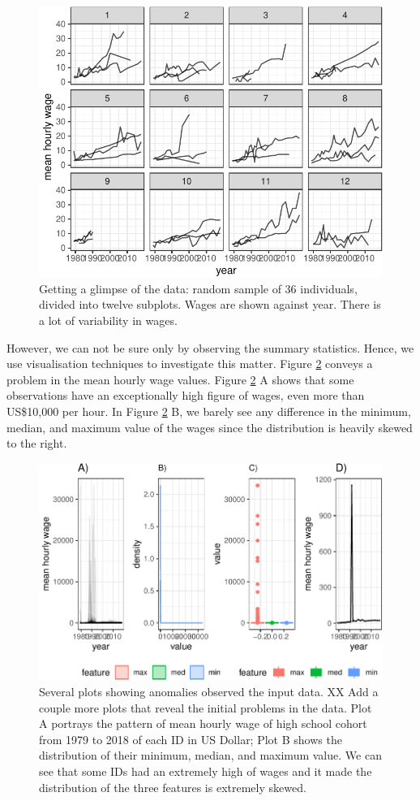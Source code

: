 \documentclass{article}
\begin{document}
\begin{figure}

{\centering \includegraphics[width=0.7\linewidth]{figures/sample-plot-1} 

}

\caption{Getting a glimpse of the data: random sample of 36 individuals, divided into  twelve subplots. Wages are shown against year. There is a lot of variability in wages.}\label{fig:sample-plot}
\end{figure}

However, we can not be sure only by observing the summary statistics. Hence, we use visualisation techniques to investigate this matter. Figure \ref{fig:feature-plot} conveys a problem in the mean hourly wage values. Figure \ref{fig:feature-plot} A shows that some observations have an exceptionally high figure of wages, even more than US\$10,000 per hour. In Figure \ref{fig:feature-plot} B, we barely see any difference in the minimum, median, and maximum value of the wages since the distribution is heavily skewed to the right.

\begin{figure}

{\centering \includegraphics[width=0.7\linewidth]{figures/feature-plot-1} 

}

\caption{Several plots showing anomalies observed the input data. XX Add a couple more plots that reveal the initial problems in the data. Plot A portrays the pattern of mean hourly wage of high school cohort from 1979 to 2018 of each ID in US Dollar; Plot B shows the distribution of their minimum, median, and maximum value. We can see that some IDs had an extremely high of wages and it made the distribution of the three features is extremely skewed.}\label{fig:feature-plot}
\end{figure}
\end{document}
